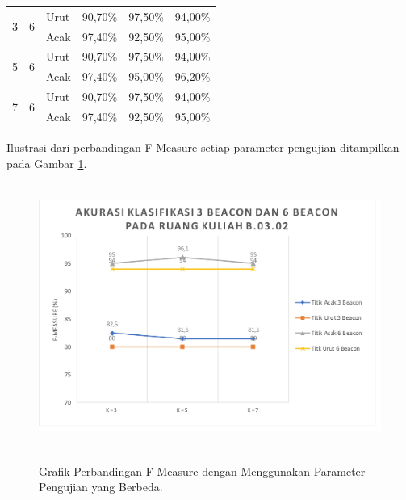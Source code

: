 \begin{enumerate}
\begin{table}[H]
\begin{tabular}{|c|c|l|c|c|c|}
\multirow{2}{*}{3} & \multirow{2}{*}{6} & Urut                             & 90,70\%   & 97,50\% & 94,00\%    \\ \cline{3-6} 
                   &                    & Acak                             & 97,40\%   & 92,50\% & 95,00\%    \\ \hline
\multirow{2}{*}{5} & \multirow{2}{*}{6} & Urut                             & 90,70\%   & 97,50\% & 94,00\%    \\ \cline{3-6} 
                   &                    & Acak                             & 97,40\%   & 95,00\%  & 96,20\%   \\ \hline
\multirow{2}{*}{7} & \multirow{2}{*}{6} & Urut                             & 90,70\%   & 97,50\% & 94,00\%    \\ \cline{3-6} 
                   &                    & Acak                             & 97,40\%   & 92,50\% & 95,00\%    \\ \hline
\end{tabular}
\end{table}

\par Ilustrasi dari perbandingan F-Measure setiap parameter pengujian ditampilkan pada Gambar \ref{gambar-grafik-akurasi-klasifikasi-6-beacon}.
		\begin{figure}[H]
			\center
			\shadowbox
			{\includegraphics [width = 14cm, height= 8.7cm]{gambar/pengujian/grafik-akurasi-klasifikasi-kelas-b0302}}
			\caption{Grafik Perbandingan F-Measure dengan Menggunakan Parameter Pengujian yang Berbeda.}
			\label{gambar-grafik-akurasi-klasifikasi-6-beacon}
		\end{figure}
		

\end{enumerate}
